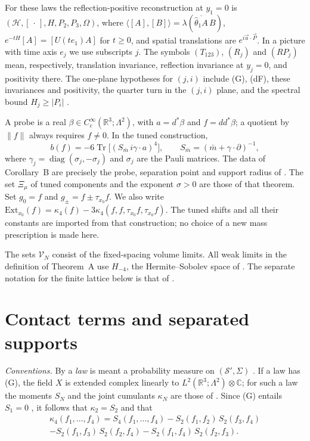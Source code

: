 \documentclass[11pt,letterpaper,reqno]{amsart}
\theoremstyle{definition}
\begin{document}
For these laws the reflection-positive reconstruction at $y_1=0$ is
$(\mathcal H,[\,\cdot\,],H,P_2,P_3,\Omega)$, where
$\langle[A],[B]\rangle=\lambda(\overline{\widehat\theta_1A}\,B)$,
$e^{-tH}[A]=[U(te_1)A]$ for $t\ge0$, and spatial translations are
$e^{i\vec a\cdot\vec P}$. In a picture with time axis $e_j$ we use
subscripts $j$. The symbols $(T_{123})$, $(R_j)$ and $(RP_j)$ mean,
respectively, translation invariance, reflection invariance at $y_j=0$,
and positivity there. The one-plane hypotheses for $(j,i)$ include
(G), (dF), these invariances and positivity, the quarter turn in the
$(j,i)$ plane, and the spectral bound $H_j\ge|P_i|$
\cite[Definition~14.2]{QEDII}.

A probe is a real $\beta\in C_c^\infty(\mathbb R^3;\Lambda^2)$, with
$a=d^*\beta$ and $f=dd^*\beta$; a quotient by $\|f\|$ always requires
$f\ne0$. In the tuned construction,
\[
b(f)=-6\operatorname{Tr}\bigl[(S_{\bar m}\,i\gamma\cdot a)^4\bigr],
\qquad S_{\bar m}=(\bar m+\gamma\cdot\partial)^{-1},
\]
where $\gamma_j=\operatorname{diag}(\sigma_j,-\sigma_j)$ and $\sigma_j$
are the Pauli matrices. The data of Corollary~B are precisely the probe,
separation point and support radius of \cite[Proposition~43.2; Theorem~44]{QEDIII}.
The set $\Xi_\mu$ of tuned components and the exponent $\sigma>0$ are
those of that theorem. Set $g_0=f$ and $g_\pm=f\pm\tau_{x_0}f$. We also write
$\mathrm{Ext}_{x_0}(f)=\allowbreak \kappa_4(f)-3\kappa_4(f,\allowbreak f,\allowbreak \tau_{x_0}f,\allowbreak \tau_{x_0}f)$.
The tuned shifts and all their constants are imported from that
construction; no choice of a new mass prescription is made here.

The sets $\mathcal V_N$ consist of the fixed-spacing volume limits.
All weak limits in the definition of Theorem~A use $H_{-4}$, the
Hermite--Sobolev space of \cite[Sections~2.4 and~7.1.5]{QEDI}.
The separate notation for the finite lattice below is that of
\cite[Sections~2 and~3]{QEDII}.


\section{Contact terms and separated supports}

\emph{Conventions.}
By a \emph{law} is meant a probability measure on $(\mathcal S',\Sigma)$ \cite[Notation~(n1)]{QEDIII}.
If a law has (G), the field $X$ is extended complex linearly to $L^2(\mathbb{R}^3;\Lambda^2)\otimes\mathbb{C}$; for such a law the moments $S_N$ and the joint cumulants $\kappa_N$ are those of \cite[Notation~(n5),~(n8)]{QEDIII}.
Since (G) entails $S_1=0$ \cite[Proposition~45.2\,(1),~(8)]{QEDIII}, it follows that $\kappa_2=S_2$ and that
\begin{multline*}
\kappa_4(f_1,\dots,f_4)=S_4(f_1,\dots,f_4)-S_2(f_1,f_2)\,S_2(f_3,f_4)\\
-S_2(f_1,f_3)\,S_2(f_2,f_4)-S_2(f_1,f_4)\,S_2(f_2,f_3).
\end{multline*}
\end{document}

